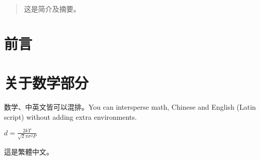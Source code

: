 \documentclass{ctexart}
\begin{document}
\tableofcontents

\begin{abstract}
这是简介及摘要。
\end{abstract}

\section{前言}

\section{关于数学部分}
数学、中英文皆可以混排。You can intersperse math, Chinese and English (Latin script) without adding extra environments.

$d = \frac{2kT}{\sqrt{2}\pi\sigma^2P}$

這是繁體中文。
\end{document}
